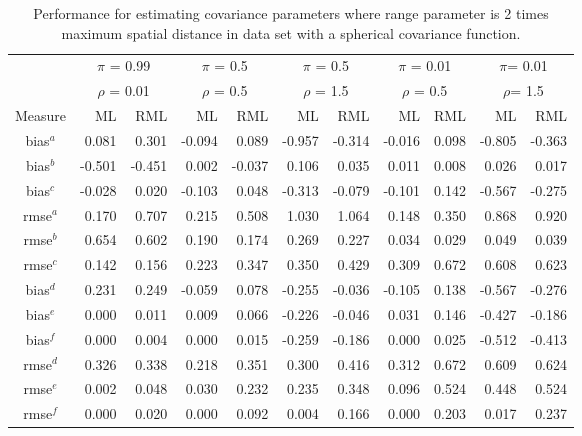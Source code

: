 \documentclass[12pt, titlepage]{article}
\begin{document}
\begin{table}[h]
				\caption{Performance for estimating covariance parameters where range parameter is 2 times maximum spatial distance in data set with a spherical covariance function.}
\begin{center}
\begin{tabular}{c|rr|rr|rr|rr|rr}
  \hline
  \hline
  & \multicolumn{2}{|c|}{$\pi$ = 0.99} & \multicolumn{2}{|c|}{$\pi$ = 0.5}  
  & \multicolumn{2}{|c|}{$\pi$ = 0.5} & \multicolumn{2}{|c}{$\pi$ = 0.01} 
  & \multicolumn{2}{|c}{$\pi$= 0.01} \\
  & \multicolumn{2}{|c|}{$\rho$ = 0.01} & \multicolumn{2}{|c|}{$\rho$ = 0.5}  
  & \multicolumn{2}{|c|}{$\rho$ = 1.5} & \multicolumn{2}{|c}{$\rho$ = 0.5} 
  & \multicolumn{2}{|c}{$\rho$= 1.5} \\
  Measure & ML & RML & ML & RML & ML & RML & ML & RML & ML & RML \\
	\hline
  \hline
	bias$^a$ & 0.081 & 0.301 & -0.094 & 0.089 & -0.957 & -0.314 & -0.016 & 0.098 & -0.805 & -0.363 \\ 
	bias$^b$ & -0.501 & -0.451 & 0.002 & -0.037 & 0.106 & 0.035 & 0.011 & 0.008 & 0.026 & 0.017 \\ 
	bias$^c$ & -0.028 & 0.020 & -0.103 & 0.048 & -0.313 & -0.079 & -0.101 & 0.142 & -0.567 & -0.275 \\ 
	rmse$^a$ & 0.170 & 0.707 & 0.215 & 0.508 & 1.030 & 1.064 & 0.148 & 0.350 & 0.868 & 0.920 \\ 
	rmse$^b$ & 0.654 & 0.602 & 0.190 & 0.174 & 0.269 & 0.227 & 0.034 & 0.029 & 0.049 & 0.039 \\ 
	rmse$^c$ & 0.142 & 0.156 & 0.223 & 0.347 & 0.350 & 0.429 & 0.309 & 0.672 & 0.608 & 0.623 \\ 
	bias$^d$ & 0.231 & 0.249 & -0.059 & 0.078 & -0.255 & -0.036 & -0.105 & 0.138 & -0.567 & -0.276 \\ 
	bias$^e$ & 0.000 & 0.011 & 0.009 & 0.066 & -0.226 & -0.046 & 0.031 & 0.146 & -0.427 & -0.186 \\ 
	bias$^f$ & 0.000 & 0.004 & 0.000 & 0.015 & -0.259 & -0.186 & 0.000 & 0.025 & -0.512 & -0.413 \\ 
	rmse$^d$ & 0.326 & 0.338 & 0.218 & 0.351 & 0.300 & 0.416 & 0.312 & 0.672 & 0.609 & 0.624 \\ 
	rmse$^e$ & 0.002 & 0.048 & 0.030 & 0.232 & 0.235 & 0.348 & 0.096 & 0.524 & 0.448 & 0.524 \\ 
	rmse$^f$ & 0.000 & 0.020 & 0.000 & 0.092 & 0.004 & 0.166 & 0.000 & 0.203 & 0.017 & 0.237 \\ 

\end{tabular}
\end{center}
\end{table}
\end{document}
